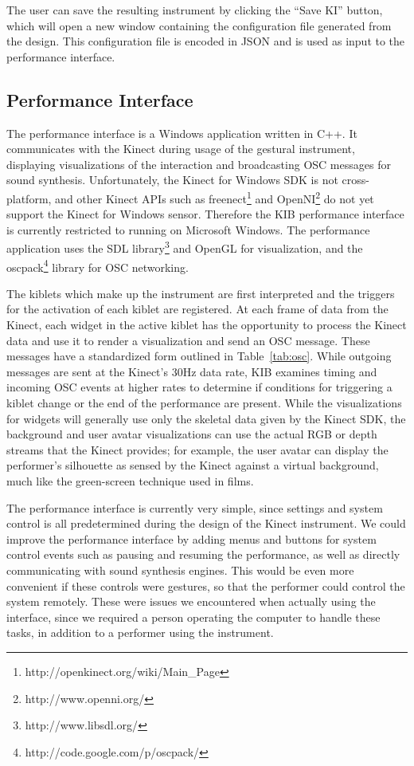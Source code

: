 \documentclass{nime-alternate}
\begin{document}
The user can save the resulting instrument by clicking the ``Save KI'' button, which will open
a new window containing the configuration file generated from the design. This configuration
file is encoded in JSON and is used as input to the performance interface.
\subsection{Performance Interface}

The performance interface is a Windows application written in C++. It communicates with the Kinect during usage of the gestural instrument,
displaying visualizations of the interaction and broadcasting OSC messages for sound synthesis. Unfortunately, the Kinect
for Windows SDK is not cross-platform, and other Kinect APIs such as freenect\footnote{http://openkinect.org/wiki/Main\_Page} and OpenNI\footnote{http://www.openni.org/} do not yet support
the Kinect for Windows sensor. Therefore the KIB performance interface is currently restricted
to running on Microsoft Windows. The performance application uses the SDL library\footnote{http://www.libsdl.org/} and OpenGL
for visualization, and the oscpack\footnote{http://code.google.com/p/oscpack/} library for
OSC networking. 

The kiblets which make up the instrument are first interpreted and the triggers for the activation of
each kiblet are registered. At each frame of data from the Kinect, each widget in the active kiblet 
has the opportunity to process the Kinect data and use it to render a visualization and send an OSC message. 
These messages have a standardized form outlined in Table~\ref{tab:osc}. While outgoing messages are
sent at the Kinect's 30Hz data rate, KIB examines timing and incoming OSC events at higher rates 
to determine if conditions for triggering a kiblet change or the end of the performance
are present.
While the visualizations for widgets will generally use only the skeletal data given by the
Kinect SDK, the background and user avatar visualizations can use the actual RGB or depth streams
that the Kinect provides; for example, the user avatar can display the performer's silhouette as
sensed by the Kinect against a virtual background, much like the green-screen technique used in films. 

The performance interface is currently very simple, since settings and system control is all predetermined
during the design of the Kinect instrument. We could improve the performance interface by
adding menus and buttons for system control events such as pausing and resuming the performance, as
well as directly communicating with sound synthesis engines. This would be even more convenient if these
controls were gestures, so that the performer could control the system remotely. 
These were issues we encountered when actually
using the interface, since we required a person operating the computer to handle these tasks, in
addition to a performer using the instrument.
\end{document}
